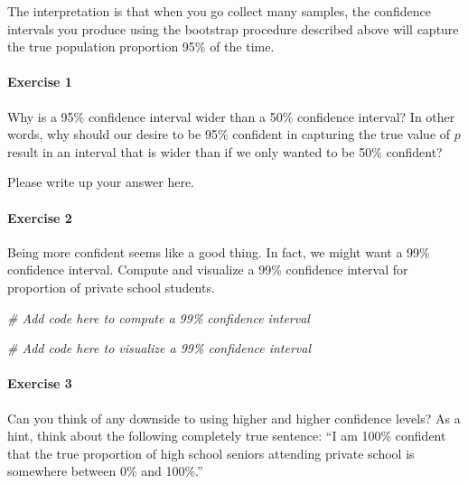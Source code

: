 \documentclass[
]{book}
\newenvironment{Shaded}{\begin{snugshade}}{\end{snugshade}}
\newcommand{\CommentTok}[1]{\textcolor[rgb]{0.56,0.35,0.01}{\textit{#1}}}
\begin{document}
The interpretation is that when you go collect many samples, the confidence intervals you produce using the bootstrap procedure described above will capture the true population proportion 95\% of the time.

\hypertarget{exercise-1-9}{%
\paragraph*{Exercise 1}\label{exercise-1-9}}

Why is a 95\% confidence interval wider than a 50\% confidence interval? In other words, why should our desire to be 95\% confident in capturing the true value of \(p\) result in an interval that is wider than if we only wanted to be 50\% confident?

Please write up your answer here.

\hypertarget{exercise-2-6}{%
\paragraph*{Exercise 2}\label{exercise-2-6}}

Being more confident seems like a good thing. In fact, we might want a 99\% confidence interval. Compute and visualize a 99\% confidence interval for proportion of private school students.

\begin{Shaded}
\begin{Highlighting}[]
\CommentTok{\# Add code here to compute a 99\% confidence interval}
\end{Highlighting}
\end{Shaded}

\begin{Shaded}
\begin{Highlighting}[]
\CommentTok{\# Add code here to visualize a 99\% confidence interval}
\end{Highlighting}
\end{Shaded}

\hypertarget{exercise-3-7}{%
\paragraph*{Exercise 3}\label{exercise-3-7}}

Can you think of any downside to using higher and higher confidence levels? As a hint, think about the following completely true sentence: ``I am 100\% confident that the true proportion of high school seniors attending private school is somewhere between 0\% and 100\%.''
\end{document}
